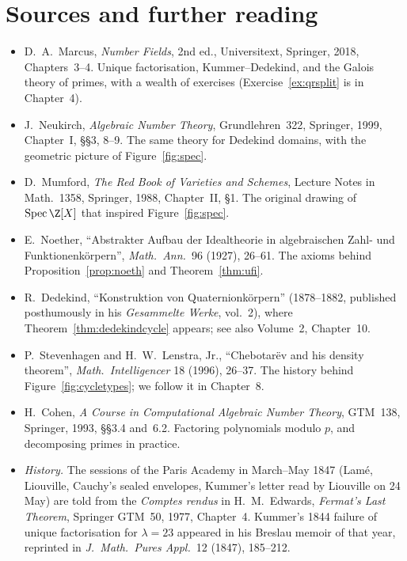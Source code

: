 \section*{Sources and further reading}

\begin{itemize}
\item D.~A.~Marcus, \emph{Number Fields}, 2nd ed., Universitext, Springer, 2018, Chapters~3--4. Unique factorisation,
Kummer--Dedekind, and the Galois theory of primes, with a wealth of exercises (Exercise~\ref{ex:qrsplit} is in Chapter~4).
\item J.~Neukirch, \emph{Algebraic Number Theory}, Grundlehren~322, Springer, 1999, Chapter~I, \S\S3, 8--9. The same
theory for Dedekind domains, with the geometric picture of Figure~\ref{fig:spec}.
\item D.~Mumford, \emph{The Red Book of Varieties and Schemes}, Lecture Notes in Math.~1358, Springer, 1988, Chapter~II,
\S1. The original drawing of $\operatorname{Spec}\Z[X]$ that inspired Figure~\ref{fig:spec}.
\item E.~Noether, ``Abstrakter Aufbau der Idealtheorie in algebraischen Zahl- und Funktionenk\"orpern'',
\emph{Math.\ Ann.}\ 96 (1927), 26--61. The axioms behind Proposition~\ref{prop:noeth} and Theorem~\ref{thm:ufi}.
\item R.~Dedekind, ``Konstruktion von Quaternionk\"orpern'' (1878--1882, published posthumously in his \emph{Gesammelte
Werke}, vol.~2), where Theorem~\ref{thm:dedekindcycle} appears; see also Volume~2, Chapter~10.
\item P.~Stevenhagen and H.~W.~Lenstra, Jr., ``Chebotar\"ev and his density theorem'', \emph{Math.\ Intelligencer}
18 (1996), 26--37. The history behind Figure~\ref{fig:cycletypes}; we follow it in Chapter~8.
\item H.~Cohen, \emph{A Course in Computational Algebraic Number Theory}, GTM~138, Springer, 1993, \S\S3.4 and~6.2.
Factoring polynomials modulo $p$, and decomposing primes in practice.
\item \emph{History.} The sessions of the Paris Academy in March--May 1847 (Lam\'e, Liouville, Cauchy's sealed envelopes,
Kummer's letter read by Liouville on 24 May) are told from the \emph{Comptes rendus} in H.~M.~Edwards, \emph{Fermat's Last
Theorem}, Springer GTM~50, 1977, Chapter~4. Kummer's 1844 failure of unique factorisation for $\lambda=23$ appeared in his
Breslau memoir of that year, reprinted in \emph{J.\ Math.\ Pures Appl.}\ 12 (1847), 185--212.
\end{itemize}
